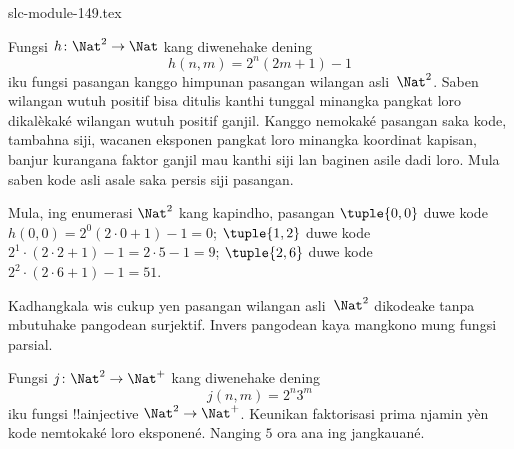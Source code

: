 \begin{filecontents*}[overwrite]{slc-module-149.tex}
\begin{ex}
Fungsi $h\colon \Nat^2 \to \Nat$ kang diwenehake dening
\[
h(n,m) = 2^n (2m+1) - 1
\]
iku fungsi pasangan kanggo himpunan pasangan wilangan asli~$\Nat^2$.
Saben wilangan wutuh positif bisa ditulis kanthi tunggal minangka pangkat loro
dikalèkaké wilangan wutuh positif ganjil. Kanggo nemokaké pasangan saka
kode, tambahna siji, wacanen eksponen pangkat loro minangka koordinat
kapisan, banjur kurangana faktor ganjil mau kanthi siji lan baginen asile dadi loro.
Mula saben kode asli asale saka persis siji pasangan.
\end{ex}

\begin{explain}
Mula, ing enumerasi $\Nat^2$ kang kapindho, pasangan
$\tuple{0,0}$ duwe kode $h(0,0) = 2^0(2\cdot 0+1) - 1 = 0$;
$\tuple{1,2}$ duwe kode $2^{1} \cdot (2 \cdot 2 + 1) - 1 = 2
\cdot 5 - 1 = 9$; $\tuple{2,6}$ duwe kode $2^{2} \cdot (2
\cdot 6 + 1) - 1 = 51$.
\end{explain}

Kadhangkala wis cukup yen pasangan wilangan asli~$\Nat^2$ dikodeake
tanpa mbutuhake pangodean surjektif. Invers pangodean kaya mangkono
mung fungsi parsial.

\begin{ex}
Fungsi $j\colon \Nat^2 \to \Nat^+$ kang diwenehake dening
\[
j(n,m) = 2^n3^m
\]
iku fungsi !!a{injective} $\Nat^2 \to \Nat^+$.
Keunikan faktorisasi prima njamin yèn kode nemtokaké loro eksponené.
Nanging $5$ ora ana ing jangkauané.
\end{ex}


\end{filecontents*}

